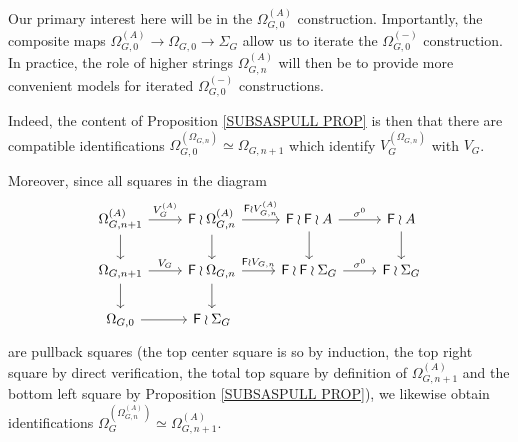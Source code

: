 \documentclass[a4paper,10pt]{article}%
\begin{document}
\begin{remark}
Our primary interest here will be in the 
$\Omega_{G,0}^{(A)}$ construction.
Importantly, the composite maps 
$\Omega_{G,0}^{(A)} \to \Omega_{G,0} \to \Sigma_G$
allow us to iterate the $\Omega_{G,0}^{(\minus)}$ construction. In practice, the role of higher strings $\Omega_{G,n}^{(A)}$ will then be to provide more convenient models for iterated 
$\Omega_{G,0}^{(\minus)}$ constructions.


Indeed, the content of Proposition \ref{SUBSASPULL PROP} is then that there are compatible identifications
$\Omega_{G,0}^{(\Omega_{G,n})} \simeq \Omega_{G,n+1}$
which identify $V_G^{(\Omega_{G,n})}$ with $V_G$.

Moreover, since all squares in the diagram
\begin{equation}\label{ALLSQUARES EQ}
\begin{tikzcd}
	\Omega^{(A)}_{G,n+1} \ar{r}{V_G^{(A)}} \ar{d}& 
	\Fin \wr \Omega^{(A)}_{G,n} \ar{r}{\Fin \wr V_{G,n}^{(A)}} \ar{d}&
	\Fin \wr \Fin \wr A  \ar{d} \ar{r}{\sigma^0} &
	\Fin \wr A \ar{d}
\\
	\Omega_{G,n+1} \ar{r}{V_G} \ar{d} &
	\Fin \wr \Omega_{G,n} \ar{r}{\Fin \wr V_{G,n}} \ar{d} &
	\Fin \wr \Fin \wr \Sigma_G \ar{r}{\sigma^0} &
	\Fin \wr \Sigma_G
\\
	\Omega_{G,0} \ar{r} &
	\Fin \wr \Sigma_G
\end{tikzcd}
\end{equation}
are pullback squares (the top center square is so by induction, the top right square by direct verification, the total top square by definition of $\Omega_{G,n+1}^{(A)}$ and the bottom left square by Proposition \ref{SUBSASPULL PROP}),
we likewise obtain identifications 
$\Omega_G^{\left(\Omega_{G,n}^{(A)}\right)} \simeq \Omega_{G,n+1}^{(A)}$.
\end{remark}
\end{document}

